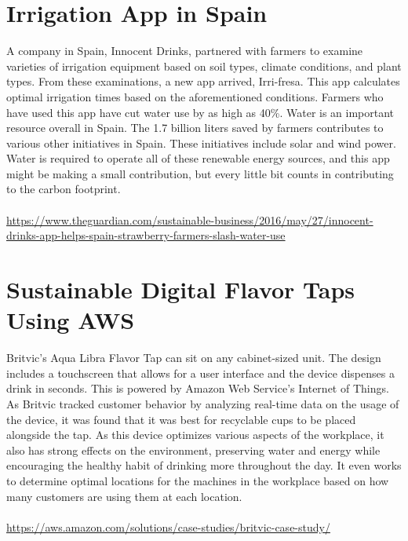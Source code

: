 \documentclass{article}
\begin{document}
\begin{spacing}{2.15}
    \section{Irrigation App in Spain}
    \indent A company in Spain, Innocent Drinks, partnered with farmers to examine varieties of irrigation equipment based on soil types, climate conditions, and plant types. From these examinations, a new app arrived, Irri-fresa. This app calculates optimal irrigation times based on the aforementioned conditions. Farmers who have used this app have cut water use by as high as 40\%. Water is an important resource overall in Spain. The 1.7 billion liters saved by farmers contributes to various other initiatives in Spain. These initiatives include solar and wind power. Water is required to operate all of these renewable energy sources, and this app might be making a small contribution, but every little bit counts in contributing to the carbon footprint.\\\\
    \url{https://www.theguardian.com/sustainable-business/2016/may/27/innocent-drinks-app-helps-spain-strawberry-farmers-slash-water-use}
    \section{Sustainable Digital Flavor Taps Using AWS}
    \indent Britvic's Aqua Libra Flavor Tap can sit on any cabinet-sized unit. The design includes a touchscreen that allows for a user interface and the device dispenses a drink in seconds. This is powered by Amazon Web Service's Internet of Things. As Britvic tracked customer behavior by analyzing real-time data on the usage of the device, it was found that it was best for recyclable cups to be placed alongside the tap. As this device optimizes various aspects of the workplace, it also has strong effects on the environment, preserving water and energy while encouraging the healthy habit of drinking more throughout the day. It even works to determine optimal locations for the machines in the workplace based on how many customers are using them at each location.\\\\
    \url{https://aws.amazon.com/solutions/case-studies/britvic-case-study/}
    \newpage

\end{spacing}
\end{document}
